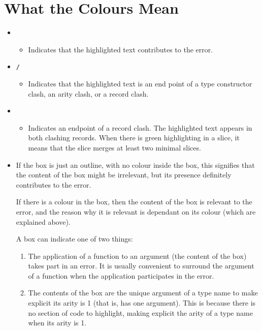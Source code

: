 \documentclass{report}
\begin{document}
\section{What the Colours Mean}

\begin{itemize}

\item \texttt{}

\begin{itemize}
\item Indicates that the highlighted text contributes to the error.
\end{itemize}

\item \texttt{/}

\begin{itemize}
\item Indicates that the highlighted text is an end point of a
  type constructor clash, an arity clash, or a record clash.

\end{itemize}

\item \texttt{}

\begin{itemize}
\item Indicates an endpoint of a record clash. The highlighted text
  appears in both clashing records. When there is green
  highlighting in a slice, it means that the slice merges at least two
  minimal slices.
\end{itemize}

\item \texttt{}

\subitem If the box is just an outline, with no colour inside the box,
  this signifies that the content of the box might be irrelevant, but its
  presence definitely contributes to the error.

\subitem If there is a colour in the box, then the
  content of the box is relevant to the error, and the reason why it
  is relevant is dependant on its colour (which are explained above).

\subitem A box can indicate one of two things:

\begin{enumerate}
\item The application of a
  function to an argument (the content of the box) takes part in an
  error. It is usually convenient to surround the argument of a
  function when the application participates in the error.
\item The contents of the box are the unique argument of a type name
  to make explicit its arity is 1 (that is, has one argument). This is
  because there is no section of code to highlight, making explicit the
  arity of a type name when its arity is 1.
\end{enumerate}


\end{itemize}
\end{document}
